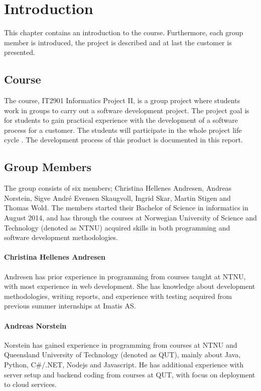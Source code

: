 
\chapter{Introduction}
This chapter contains an introduction to the course. Furthermore, each group member is introduced, the project is described and at last the customer is presented. 

\section{Course}
The course, IT2901 Informatics Project II, is a group project where students work in groups to carry out a software development project. The project goal is for students to gain practical experience with the development of a software process for a customer. The students will participate in the whole project life cycle \cite{EmneKode}. The development process of this product is documented in this report.


\section{Group Members}
The group consists of six members; Christina Hellenes Andresen, Andreas Norstein, Sigve André Evensen Skaugvoll, Ingrid Skar, Martin Stigen and Thomas Wold. The members started their Bachelor of Science in informatics in August 2014, and has through the courses at Norwegian University of Science and Technology (denoted as NTNU)  acquired skills in both programming and software development methodologies.

\subsubsection{Christina Hellenes Andresen}
\label{christina}
Andresen has prior experience in programming from courses taught at NTNU, with most experience in web development. She has knowledge about development methodologies, writing reports, and experience with testing acquired from previous summer internships at Imatis AS.

\subsubsection{Andreas Norstein}
\label{andreas}
Norstein has gained experience in programming from courses at NTNU and Queensland University of Technology (denoted as QUT), mainly about Java, Python, C\#/.NET, Nodejs and Javascript. He has additional experience with server setup and backend coding from courses at QUT, with focus on deployment to cloud services. 

